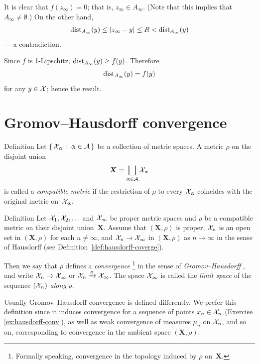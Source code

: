 It is clear that $f(z_\infty)=0$;
that is, $z_\infty\in A_\infty$. 
(Note that  this implies that $A_\infty\ne \emptyset$.)
On the other hand, 
\begin{align*}
\distfun_{A_\infty}(y)
\le
\dist{z_\infty}{y}{}
\le R
<
\distfun_{A_\infty}(y)
\end{align*}
 --- a contradiction.

Since $f$ is 1-Lipschitz, $\distfun_{A_\infty}(y)\ge f(y)$.
Therefore
\[\mathrm{dist}_{A_\infty}(y)= f(y)\]
for any $y\in \spc{X}$; hence the result.
\qeds

\section{Gromov--Hausdorff convergence}

\begin{thm}{Definition}\label{def:comp-metr}
Let $\set{\spc{X}_\alpha}{\alpha\in\IndexSet}$ be a collection of metric spaces.
A metric $\rho$ on the disjoint union
$$\bm{X}=\bigsqcup_{\alpha\in\IndexSet} \spc{X}_\alpha$$
is called a  \emph{compatible metric}
if the restriction of $\rho$ to every $\mathcal{X}_\upalpha$ coincides with the original metric on~$\mathcal{X}_\upalpha$.
\end{thm}

\begin{thm}{Definition}\label{def:GH}
Let $\mathcal{X}_1,\mathcal{X}_2,\ldots$
and $\mathcal{X}_\infty$ be proper metric spaces 
and $\rho$ be a compatible metric on their disjoint union~$\bm{X}$.
Assume that $(\bm{X},\rho)$ is proper,
$\mathcal{X}_n$ is an open set in
$(\bm{X},\rho)$ for each $n\ne\infty$, and 
$\spc{X}_n\to \spc{X}_\infty$ in $(\bm{X},\rho)$ as $n\to\infty$ in the sense of Hausdorff (see Definition~\ref{def:hausdorff-coverge}).

Then we say that $\rho$ defines a {}\emph{convergence}%
\footnote{Formally speaking, convergence in the topology induced by $\rho$ on~$\bm{X}$.} 
in the sense of \emph{Gromov--Hausdorff}%
,
and write $\spc{X}_n\to \spc{X}_\infty$ or $\mathcal{X}_n\xrightarrow{\upvarrho} \mathcal{X}_\infty$.
The space $\mathcal{X}_\infty$ is called the \emph{limit space} of the sequence $(\mathcal{X}_n)$ \emph{along} $\rho$.
\end{thm}

Usually Gromov--Hausdorff convergence is defined differently.
We prefer this definition since it induces convergence for a sequence of points $x_n\in\spc{X}_n$ (Exercise \ref{ex:hausdorff-conv}),
as well as 
weak convergence of measures $\mu_n$ on $\mathcal{X}_n$, 
and so on,
corresponding to convergence in the ambient space $(\bm{X},\rho)$.

